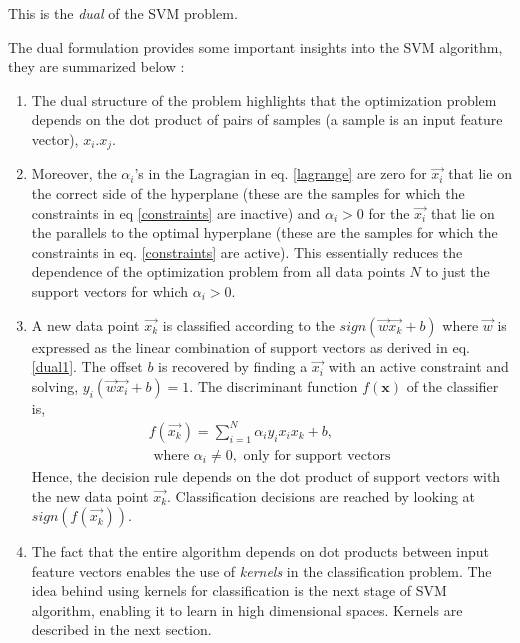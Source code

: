 \documentclass[final,3p,times,twocolumn]{elsarticle}
\begin{document}
This is the \textit{dual} of the SVM problem.

The dual formulation provides some important insights into the SVM algorithm, they are summarized below :

\begin{enumerate}
\item{The dual structure of the problem highlights that the optimization problem depends on the dot product of pairs of samples (a sample is an input feature vector), $x_{i}.x_{j}$.}
\item{Moreover, the $\alpha_{i}$'s in the Lagragian in eq. \ref{lagrange} are zero for $\vec{x_{i}}$ that lie on the correct side of the hyperplane (these are the samples for which the constraints in eq \ref{constraints} are inactive) and $\alpha_{i} > 0$ for the $\vec{x_{i}}$ that lie on the parallels to the optimal hyperplane (these are the samples for which the constraints in eq. \ref{constraints} are active). This essentially reduces the dependence of the optimization problem from all data points $N$ to just the support vectors for which $\alpha_{i} > 0$.}
\item{A new data point $\vec{x_{k}}$ is classified according to the $sign(\vec{w}\vec{x_{k}} + b)$ where $\vec{w}$ is expressed as the linear combination of support vectors as derived in eq. \ref{dual1}. The offset $b$ is recovered by finding a $\vec{x_{i}}$ with an active constraint and solving, $y_{i}(\vec{w}\vec{x_{i}} + b) = 1$. The discriminant function $f(\textbf{x})$ of the classifier is,
\begin{gather}
f(\vec{x_{k}}) = \sum_{i=1}^N\alpha_{i}y_{i}x_{i}x_{k} + b, \\
\textrm{ where } \alpha_{i} \neq 0,\textrm{ only for support vectors } \nonumber
\end{gather} Hence, the decision rule depends on the dot product of support vectors with the new data point $\vec{x_{k}}$. Classification decisions are reached by looking at $sign(f(\vec{x_{k}}))$.}
\item{The fact that the entire algorithm depends on dot products between input feature vectors enables the use of \textit{kernels} in the classification problem. The idea behind using kernels for classification is the next stage of SVM algorithm, enabling it to learn in high dimensional spaces. Kernels are described in the next section.}
\end{enumerate}
\end{document}

